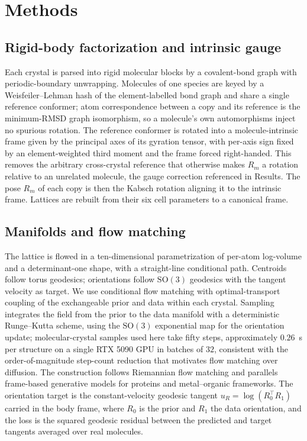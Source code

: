 \documentclass[11pt]{article}
\begin{document}
\section{Methods}

\subsection{Rigid-body factorization and intrinsic gauge}
Each crystal is parsed into rigid molecular blocks by a covalent-bond graph with
periodic-boundary unwrapping. Molecules of one species are keyed by a
Weisfeiler--Lehman hash of the element-labelled bond graph and share a single
reference conformer; atom correspondence between a copy and its reference is the
minimum-RMSD graph isomorphism, so a molecule's own automorphisms inject no
spurious rotation. The reference conformer is rotated into a molecule-intrinsic
frame given by the principal axes of its gyration tensor, with per-axis sign
fixed by an element-weighted third moment and the frame forced right-handed.
This removes the arbitrary cross-crystal reference that otherwise makes $R_m$ a
rotation relative to an unrelated molecule, the gauge correction referenced in
Results. The pose $R_m$ of each copy is then the Kabsch rotation aligning it to
the intrinsic frame. Lattices are rebuilt from their six cell parameters to a
canonical frame.

\subsection{Manifolds and flow matching}
The lattice is flowed in a ten-dimensional parametrization of per-atom
log-volume and a determinant-one shape, with a straight-line conditional path.
Centroids follow torus geodesics; orientations follow $\mathrm{SO}(3)$
geodesics with the tangent velocity as target. We use conditional flow
matching\cite{lipman2023flowmatching} with optimal-transport coupling of the
exchangeable prior and data within each crystal\cite{pooladian2023multisample}.
Sampling integrates the field from the prior to the data manifold with a
deterministic Runge--Kutta scheme, using the $\mathrm{SO}(3)$ exponential map
for the orientation update; molecular-crystal samples used here take fifty
steps, approximately $0.26$~s per structure on a single RTX 5090 GPU in batches
of $32$, consistent with the order-of-magnitude step-count reduction that
motivates flow matching over diffusion. The construction follows Riemannian flow
matching\cite{chen2024riemannian} and parallels frame-based generative models
for proteins\cite{yim2023se3diffusion,yim2023frameflow} and metal--organic
frameworks\cite{kim2025mofflow}. The orientation target is the constant-velocity
geodesic tangent $u_R = \log(R_0^\top R_1)$ carried in the body frame, where
$R_0$ is the prior and $R_1$ the data orientation, and the loss is the squared
geodesic residual between the predicted and target tangents averaged over real
molecules.
\end{document}
